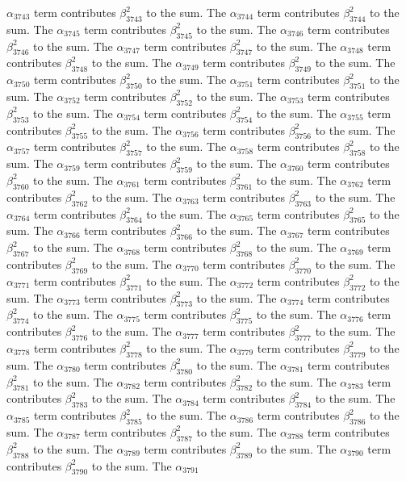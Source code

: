 \begin{lemma}
$\alpha_{3743}$ term contributes $\beta_{3743}^{2}$ to the sum. The $\alpha_{3744}$ term contributes $\beta_{3744}^{2}$ to the sum. The $\alpha_{3745}$ term contributes $\beta_{3745}^{2}$ to the sum. The $\alpha_{3746}$ term contributes $\beta_{3746}^{2}$ to the sum. The $\alpha_{3747}$ term contributes $\beta_{3747}^{2}$ to the sum. The $\alpha_{3748}$ term contributes $\beta_{3748}^{2}$ to the sum. The $\alpha_{3749}$ term contributes $\beta_{3749}^{2}$ to the sum. The $\alpha_{3750}$ term contributes $\beta_{3750}^{2}$ to the sum. The $\alpha_{3751}$ term contributes $\beta_{3751}^{2}$ to the sum. The $\alpha_{3752}$ term contributes $\beta_{3752}^{2}$ to the sum. The $\alpha_{3753}$ term contributes $\beta_{3753}^{2}$ to the sum. The $\alpha_{3754}$ term contributes $\beta_{3754}^{2}$ to the sum. The $\alpha_{3755}$ term contributes $\beta_{3755}^{2}$ to the sum. The $\alpha_{3756}$ term contributes $\beta_{3756}^{2}$ to the sum. The $\alpha_{3757}$ term contributes $\beta_{3757}^{2}$ to the sum. The $\alpha_{3758}$ term contributes $\beta_{3758}^{2}$ to the sum. The $\alpha_{3759}$ term contributes $\beta_{3759}^{2}$ to the sum. The $\alpha_{3760}$ term contributes $\beta_{3760}^{2}$ to the sum. The $\alpha_{3761}$ term contributes $\beta_{3761}^{2}$ to the sum. The $\alpha_{3762}$ term contributes $\beta_{3762}^{2}$ to the sum. The $\alpha_{3763}$ term contributes $\beta_{3763}^{2}$ to the sum. The $\alpha_{3764}$ term contributes $\beta_{3764}^{2}$ to the sum. The $\alpha_{3765}$ term contributes $\beta_{3765}^{2}$ to the sum. The $\alpha_{3766}$ term contributes $\beta_{3766}^{2}$ to the sum. The $\alpha_{3767}$ term contributes $\beta_{3767}^{2}$ to the sum. The $\alpha_{3768}$ term contributes $\beta_{3768}^{2}$ to the sum. The $\alpha_{3769}$ term contributes $\beta_{3769}^{2}$ to the sum. The $\alpha_{3770}$ term contributes $\beta_{3770}^{2}$ to the sum. The $\alpha_{3771}$ term contributes $\beta_{3771}^{2}$ to the sum. The $\alpha_{3772}$ term contributes $\beta_{3772}^{2}$ to the sum. The $\alpha_{3773}$ term contributes $\beta_{3773}^{2}$ to the sum. The $\alpha_{3774}$ term contributes $\beta_{3774}^{2}$ to the sum. The $\alpha_{3775}$ term contributes $\beta_{3775}^{2}$ to the sum. The $\alpha_{3776}$ term contributes $\beta_{3776}^{2}$ to the sum. The $\alpha_{3777}$ term contributes $\beta_{3777}^{2}$ to the sum. The $\alpha_{3778}$ term contributes $\beta_{3778}^{2}$ to the sum. The $\alpha_{3779}$ term contributes $\beta_{3779}^{2}$ to the sum. The $\alpha_{3780}$ term contributes $\beta_{3780}^{2}$ to the sum. The $\alpha_{3781}$ term contributes $\beta_{3781}^{2}$ to the sum. The $\alpha_{3782}$ term contributes $\beta_{3782}^{2}$ to the sum. The $\alpha_{3783}$ term contributes $\beta_{3783}^{2}$ to the sum. The $\alpha_{3784}$ term contributes $\beta_{3784}^{2}$ to the sum. The $\alpha_{3785}$ term contributes $\beta_{3785}^{2}$ to the sum. The $\alpha_{3786}$ term contributes $\beta_{3786}^{2}$ to the sum. The $\alpha_{3787}$ term contributes $\beta_{3787}^{2}$ to the sum. The $\alpha_{3788}$ term contributes $\beta_{3788}^{2}$ to the sum. The $\alpha_{3789}$ term contributes $\beta_{3789}^{2}$ to the sum. The $\alpha_{3790}$ term contributes $\beta_{3790}^{2}$ to the sum. The $\alpha_{3791}$ 
\end{lemma}
